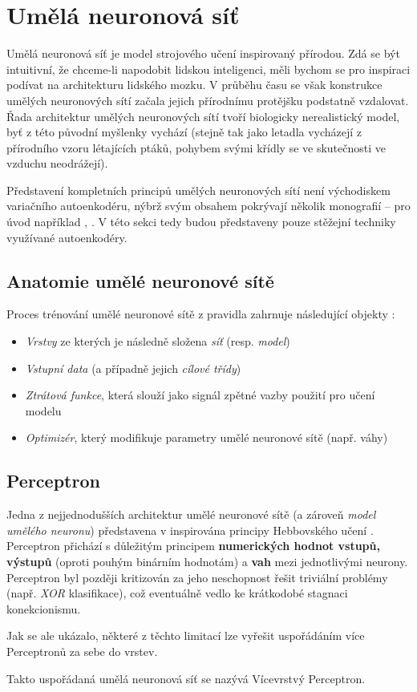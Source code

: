 \section{Umělá neuronová síť}
\label{neural_network}
Umělá neuronová síť je model strojového učení inspirovaný přírodou.
Zdá se být intuitivní, že chceme-li napodobit lidskou inteligenci, měli bychom se pro inspiraci podívat na architekturu lidského mozku.
V průběhu času se však konstrukce umělých neuronových sítí začala jejich přírodnímu protějšku podstatně vzdalovat.
Řada architektur umělých neuronových sítí tvoří biologicky nerealistický model, byť z této původní myšlenky vychází (stejně tak jako letadla vycházejí z přírodního vzoru létajících ptáků, pohybem svými křídly se ve skutečnosti ve vzduchu neodrážejí). \cite{Geron2019}

Představení kompletních principů umělých neuronových sítí není východiskem variačního autoenkodéru, nýbrž svým obsahem pokrývají několik monografií – pro úvod například \cite{Chollet2017}, \cite{Geron2019}.
V této sekci tedy budou představeny pouze stěžejní techniky využívané autoenkodéry.
\subsection{Anatomie umělé neuronové sítě}
Proces trénování umělé neuronové sítě z pravidla zahrnuje následující objekty \cite{Chollet2017}:
\begin{itemize}
    \item \emph{Vrstvy} ze kterých je následně složena \emph{síť} (resp. \emph{model})
    \item \emph{Vstupní data} (a případně jejich \emph{cílové třídy})
    \item \emph{Ztrátová funkce}, která slouží jako signál zpětné vazby použití pro učení modelu
    \item \emph{Optimizér}, který modifikuje parametry umělé neuronové sítě (např. váhy)
\end{itemize}

\subsection{Perceptron}
Jedna z nejjednodušších architektur umělé neuronové sítě (a zároveň \emph{model umělého neuronu}) představena v \cite{Rosenblatt1957} inspirována principy Hebbovského učení \cite{Hebb1949}.
Perceptron přichází s důležitým principem \textbf{numerických hodnot vstupů, výstupů} (oproti pouhým binárním hodnotám) a \textbf{vah} mezi jednotlivými neurony. 
Perceptron byl později kritizován \cite{Minsky1969} za jeho neschopnost řešit triviální problémy (např. \emph{XOR} klasifikace), což eventuálně vedlo ke krátkodobé stagnaci konekcionismu.

Jak se ale ukázalo, některé z těchto limitací lze vyřešit uspořádáním více Perceptronů za sebe do vrstev. \cite{Rumelhart1987}

Takto uspořádaná umělá neuronová síť se nazývá Vícevrstvý Perceptron.

